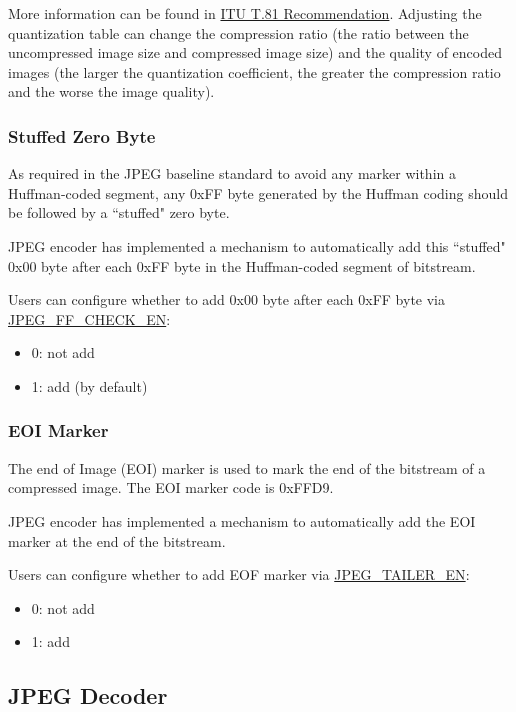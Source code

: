 \documentclass[main\_\_EN.tex]{subfiles}
\begin{document}
More information can be found in \href{https://www.itu.int/rec/T-REC-T.81}{ITU T.81 Recommendation}. Adjusting the quantization table can change the compression ratio (the ratio between the uncompressed image size and compressed image size) and the quality of encoded images (the larger the quantization coefficient, the greater the compression ratio and the worse the image quality).

\subsubsection{Stuffed Zero Byte}
\label{sec:jpegcodec-enc-zero_byte}

As required in the JPEG baseline standard to avoid any marker within a Huffman-coded segment, any 0xFF byte generated by the Huffman coding should be followed by a ``stuffed" zero byte.

JPEG encoder has implemented a mechanism to automatically add this ``stuffed" 0x00 byte after each 0xFF byte in the Huffman-coded segment of bitstream.

Users can configure whether to add 0x00 byte after each 0xFF byte via \hyperref[fielddesc:JPEGFFCHECKEN]{JPEG\_FF\_CHECK\_EN}:
\begin{itemize}
    \item 0: not add
    \item 1: add (by default)
\end{itemize}

\subsubsection{EOI Marker}
\label{sec:jpegcodec-enc-eoi}

The end of Image (EOI) marker is used to mark the end of the bitstream of a compressed image. The EOI marker code is 0xFFD9.

JPEG encoder has implemented a mechanism to automatically add the EOI marker at the end of the bitstream.

Users can configure whether to add EOF marker via \hyperref[fielddesc:JPEGTAILEREN]{JPEG\_TAILER\_EN}:
\begin{itemize}
    \item 0: not add
    \item 1: add
\end{itemize}

\subsection{JPEG Decoder}
\label{sec:jpegcodec-dec-mode}
\end{document}
